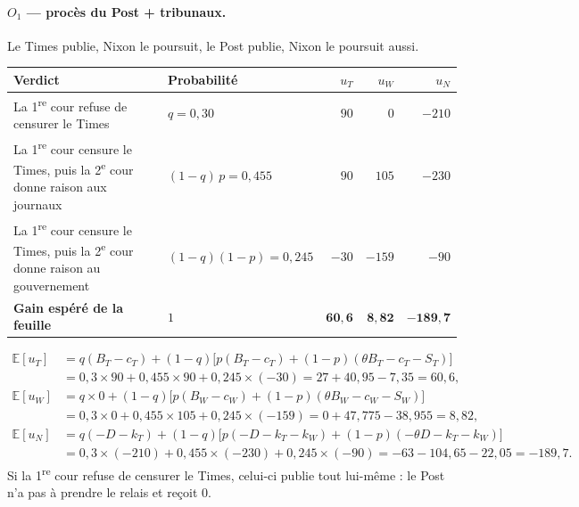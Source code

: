 \documentclass[11pt,a4paper]{article}
\theoremstyle{definition}
\newcommand{\E}{\mathbb{E}}
\begin{document}
\paragraph{$O_1$ — procès du Post + tribunaux.} Le Times publie, Nixon le poursuit, le Post publie, Nixon le poursuit aussi.
\begin{center}
\footnotesize
\begin{tabularx}{\textwidth}{@{}>{\raggedright\arraybackslash}Xlrrr@{}}
\toprule
Verdict & Probabilité & $u_T$ & $u_W$ & $u_N$ \\
\midrule
La 1\textsuperscript{re} cour refuse de censurer le Times & $q=0,30$ & $90$ & $0$ & $-210$ \\
La 1\textsuperscript{re} cour censure le Times, puis la 2\textsuperscript{e} cour donne raison aux journaux & $(1-q)\,p=0,455$ & $90$ & $105$ & $-230$ \\
La 1\textsuperscript{re} cour censure le Times, puis la 2\textsuperscript{e} cour donne raison au gouvernement & $(1-q)(1-p)=0,245$ & $-30$ & $-159$ & $-90$ \\
\midrule
\textbf{Gain espéré de la feuille} & $1$ & $\mathbf{60,6}$ & $\mathbf{8,82}$ & $\mathbf{-189,7}$ \\
\bottomrule
\end{tabularx}
\end{center}
\begin{align*}
\E[u_T] &= q(B_T-c_T)+(1-q)\big[p(B_T-c_T)+(1-p)(\theta B_T-c_T-S_T)\big]\\
&= 0,3\times90+0,455\times90+0,245\times(-30) = 27+40,95-7,35 = 60,6,\\[3pt]
\E[u_W] &= q\times0+(1-q)\big[p(B_W-c_W)+(1-p)(\theta B_W-c_W-S_W)\big]\\
&= 0,3\times0+0,455\times105+0,245\times(-159) = 0+47,775-38,955 = 8,82,\\[3pt]
\E[u_N] &= q(-D-k_T)+(1-q)\big[p(-D-k_T-k_W)+(1-p)(-\theta D-k_T-k_W)\big]\\
&= 0,3\times(-210)+0,455\times(-230)+0,245\times(-90) = -63-104,65-22,05 = -189,7.
\end{align*}
Si la 1\textsuperscript{re} cour refuse de censurer le Times, celui-ci publie tout lui-même : le Post n'a pas à prendre le relais et reçoit $0$.
\end{document}
